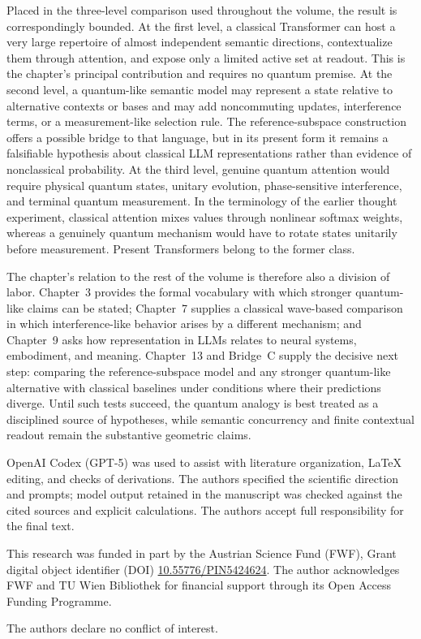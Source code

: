 \documentclass[
  aps,
  reprint,
  superscriptaddress,
  floatfix,
  nofootinbib,
  longbibliography
]{revtex4-2}
\begin{document}
Placed in the three-level comparison used throughout the volume, the result
is correspondingly bounded.  At the first level, a classical Transformer
can host a very large repertoire of almost independent semantic directions,
contextualize them through attention, and expose only a limited active set at
readout.  This is the chapter's principal contribution and requires no
quantum premise.  At the second level, a quantum-like semantic model may
represent a state relative to alternative contexts or bases and may add
noncommuting updates, interference terms, or a measurement-like selection
rule. The reference-subspace construction offers a possible bridge to that
language, but in its present form it remains a falsifiable hypothesis about
classical LLM representations rather than evidence of nonclassical
probability.  At the third level, genuine quantum attention would require
physical quantum states, unitary evolution, phase-sensitive interference,
and terminal quantum measurement.  In the terminology of the earlier
thought experiment, classical attention mixes values through nonlinear
softmax weights, whereas a genuinely quantum mechanism would have to rotate
states unitarily before measurement.  Present Transformers belong to the
former class.

The chapter's relation to the rest of the volume is therefore also a division
of labor.  Chapter~3 provides the formal vocabulary with which stronger
quantum-like claims can be stated; Chapter~7 supplies a classical
wave-based comparison in which interference-like behavior arises by a
different mechanism; and Chapter~9 asks how representation in LLMs relates
to neural systems, embodiment, and meaning.  Chapter~13 and Bridge~C supply
the decisive next step: comparing the reference-subspace model and any stronger
quantum-like alternative with classical baselines under conditions where
their predictions diverge.  Until such tests succeed, the quantum analogy is
best treated as a disciplined source of hypotheses, while semantic
concurrency and finite contextual readout remain the substantive geometric
claims.

\begin{acknowledgments}
OpenAI Codex (GPT-5) was used to assist with literature organization, \LaTeX{}
editing, and checks of derivations.  The authors specified the scientific
direction and prompts; model output retained in the manuscript was checked
against the cited sources and explicit calculations.  The authors accept full
responsibility for the final text.

This research was funded in part by the Austrian
Science Fund (FWF), Grant digital object identifier (DOI)
\href{https://doi.org/10.55776/PIN5424624}{10.55776/PIN5424624}.
The author acknowledges FWF and TU Wien Bibliothek for financial support through its
Open Access Funding Programme.

The authors declare no conflict of interest.
\end{acknowledgments}


\end{document}
